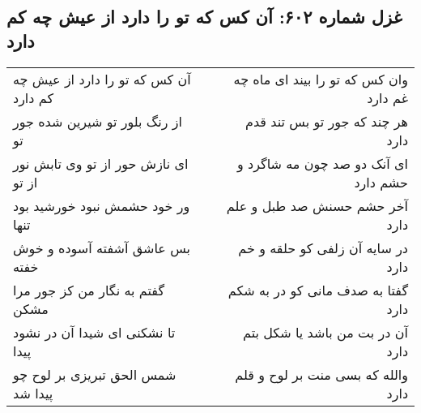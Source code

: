 \begin{center}
\section*{غزل شماره ۶۰۲: آن کس که تو را دارد از عیش چه کم دارد}
\label{sec:0602}
\begin{longtable}{l p{0.5cm} r}
آن کس که تو را دارد از عیش چه کم دارد
&&
وان کس که تو را بیند ای ماه چه غم دارد
\\
از رنگ بلور تو شیرین شده جور تو
&&
هر چند که جور تو بس تند قدم دارد
\\
ای نازش حور از تو وی تابش نور از تو
&&
ای آنک دو صد چون مه شاگرد و حشم دارد
\\
ور خود حشمش نبود خورشید بود تنها
&&
آخر حشم حسنش صد طبل و علم دارد
\\
بس عاشق آشفته آسوده و خوش خفته
&&
در سایه آن زلفی کو حلقه و خم دارد
\\
گفتم به نگار من کز جور مرا مشکن
&&
گفتا به صدف مانی کو در به شکم دارد
\\
تا نشکنی ای شیدا آن در نشود پیدا
&&
آن در بت من باشد یا شکل بتم دارد
\\
شمس الحق تبریزی بر لوح چو پیدا شد
&&
والله که بسی منت بر لوح و قلم دارد
\\
\end{longtable}
\end{center}
